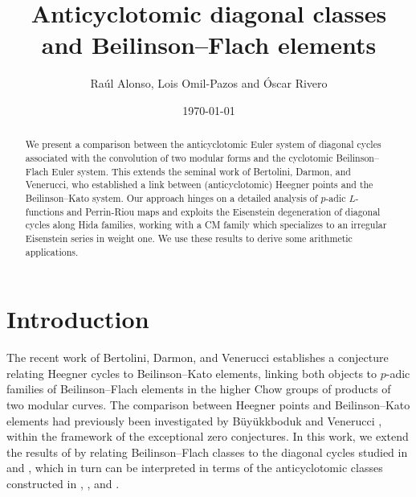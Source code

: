 \documentclass[a4paper,11pt]{amsart}
\theoremstyle{plain}
\theoremstyle{definition}
\theoremstyle{remark}
\numberwithin{equation}{section}
\begin{document}
\title[Anticyclotomic diagonal cycles and Beilinson--Flach]{Anticyclotomic diagonal classes and Beilinson--Flach elements}

\author{Ra\'ul Alonso, Lois Omil-Pazos and \'Oscar Rivero}

\begin{abstract}
We present a comparison between the anticyclotomic Euler system of diagonal cycles associated with the convolution of two modular forms and the cyclotomic Beilinson--Flach Euler system. This extends the seminal work of Bertolini, Darmon, and Venerucci, who established a link between (anticyclotomic) Heegner points and the Beilinson--Kato system. Our approach hinges on a detailed analysis of $p$-adic $L$-functions and Perrin-Riou maps and exploits the Eisenstein degeneration of diagonal cycles along Hida families, working with a CM family which specializes to an irregular Eisenstein series in weight one. We use these results to derive some arithmetic applications.
\end{abstract}


\date{\today}

\address{R. A.: School of Mathematics and Statistics, University College Dublin, Belfield, Dublin 4, Ireland}

\address{L. O.-P.: CITMAga, Santiago de Compostela, Spain}

\address{O. R.: CITMAga and Departamento de Matem\'aticas, Universidade de Santiago de Compostela, Santiago de Compostela, Spain}




\maketitle


\setcounter{tocdepth}{1}
\tableofcontents


\section{Introduction}

The recent work of Bertolini, Darmon, and Venerucci \cite{BDV} establishes a conjecture relating Heegner cycles to Beilinson--Kato elements, linking both objects to $p$-adic families of Beilinson--Flach elements in the higher Chow groups of products of two modular curves. The comparison between Heegner points and Beilinson--Kato elements had previously been investigated by B\"uy\"ukkboduk \cite{buyukboduk16} and Venerucci \cite{Ven}, within the framework of the exceptional zero conjectures. In this work, we extend the results of \cite{BDV} by relating Beilinson--Flach classes to the diagonal cycles studied in \cite{BSV} and \cite{DR3}, which in turn can be interpreted in terms of the anticyclotomic classes constructed in \cite{ACR}, \cite{ACR2}, and \cite{castella-do}.
\end{document}
